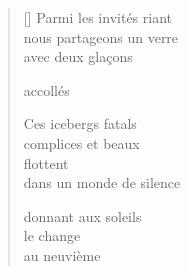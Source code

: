 \documentclass[11pt,a4paper]{article}
\begin{document}
\thispagestyle{empty}


\settowidth{\versewidth}{nous partageons un verre}

\bigskip

\begin{verse}[\versewidth]
  Parmi les invités riant \\
  nous partageons un verre \\
  avec deux glaçons

  accollés

  Ces icebergs fatals \\
  complices et beaux \\
  flottent \\
  dans un monde de silence

  donnant aux soleils \\
  le change \\
  au neuvième
\end{verse}
\end{document}
